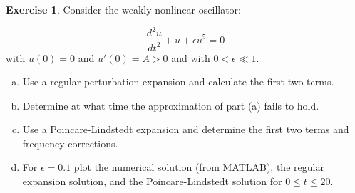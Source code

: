 \documentclass[12pt]{article}
\theoremstyle{definition}
\newtheorem{exer}{Exercise}
\theoremstyle{remark}
\begin{document}
\begin{exer}

Consider the weakly nonlinear oscillator:

\begin{equation*}
    \frac{d^{2} u}{dt^{2}} + u + \epsilon u^{5} = 0
\end{equation*}
with $u(0) = 0$ and $u'(0) = A > 0$ and with $0 < \epsilon \ll 1$.
\begin{enumerate}[(a)]
    \item  Use a regular perturbation expansion and calculate the first two terms.
    \item Determine at what time the approximation of part (a) fails to hold.
    \item Use a Poincare-Lindstedt expansion and determine the first two terms and frequency corrections. 
    \item For $\epsilon = 0.1$ plot the numerical solution (from MATLAB), the regular expansion solution, and the Poincare-Lindstedt solution for $0 \leq t \leq 20$.
\end{enumerate}
\end{exer}
\end{document}

